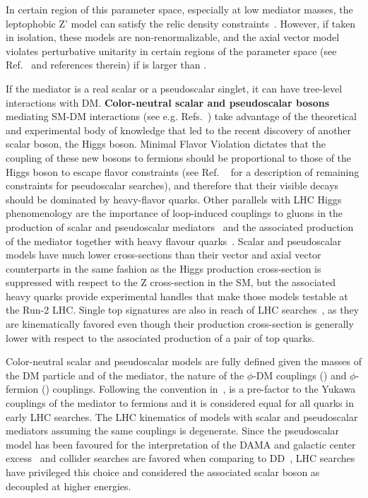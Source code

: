 In certain region of this parameter space, especially at low mediator masses, the leptophobic Z' model can satisfy the relic density constraints~\cite{Chala:2015ama}. However, if taken in isolation, these models are  non-renormalizable, and the axial vector model violates perturbative unitarity in certain regions of the parameter space (see Ref.~\cite{Boveia:2016mrp} and references therein) if \mdm is larger than \mmed. 

If the mediator is a real scalar or a pseudoscalar singlet, it can have tree-level interactions with DM.
\textbf{Color-neutral scalar and pseudoscalar bosons} mediating SM-DM interactions (see e.g. Refs.~\cite{Buckley:2014fba}) take advantage of the theoretical and experimental body of knowledge that led to the recent discovery of another scalar boson, the Higgs boson. Minimal Flavor Violation dictates that the coupling of these new bosons to fermions should be proportional to those of the Higgs boson to escape flavor constraints (see Ref. ~\cite{Dolan:2014ska} for a description of remaining constraints for pseudoscalar searches), and therefore that their visible decays should be dominated by heavy-flavor quarks. Other parallels with LHC Higgs phenomenology are the importance of loop-induced couplings to gluons in the production of scalar and pseudoscalar mediators~\cite{Haisch:2015ioa,Mattelaer:2015haa} and the associated production of the mediator together with heavy flavour quarks~\cite{Buckley:2014fba}. Scalar and pseudoscalar models have much lower cross-sections than their vector and axial vector counterparts in the same fashion as the Higgs production cross-section is suppressed with respect to the Z cross-section in the SM, but the associated heavy quarks provide experimental handles that make those models testable at the Run-2 LHC. Single top signatures are also in reach of LHC searches~\cite{Pinna:2017tay}, as they are kinematically favored even though their production cross-section is generally lower with respect to the associated production of a pair of top quarks. %

Color-neutral scalar and pseudoscalar models are fully defined given the masses of the DM particle and of the mediator, the nature of the $\phi$-DM couplings (\gdm) and $\phi$-fermion (\gq) couplings. Following the convention in~\cite{Abercrombie:2015wmb}, \gq is a pre-factor to the Yukawa couplings of the mediator to fermions and it is considered equal for all quarks in early LHC searches. 
The LHC kinematics of models with scalar and pseudoscalar mediators assuming the same couplings is degenerate. Since the pseudoscalar model has been favoured for the interpretation of the DAMA and galactic center excess~\cite{Arina:2014yna,Agrawal:2014una} and collider searches are favored when comparing to DD~\cite{Banerjee:2017wxi}, LHC searches have privileged this choice and considered the associated scalar boson as decoupled at higher energies. 

